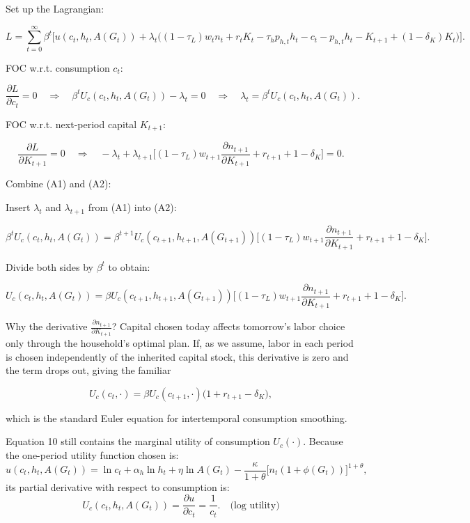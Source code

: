 Set up the Lagrangian:

\[
L = \sum_{t=0}^\infty \beta^t \Big[u(c_t, h_t, A(G_t)) + \lambda_t \Big((1-\tau_L)w_t n_t + r_t K_t - \tau_h p_{h,t} h_t - c_t - p_{h,t} h_t - K_{t+1} + (1-\delta_K)K_t \Big)\Big].
\]

FOC w.r.t. consumption \( c_t \):

\[
\frac{\partial L}{\partial c_t} = 0 \quad \Longrightarrow \quad \beta^t U_c(c_t, h_t, A(G_t)) - \lambda_t = 0 \quad \Longrightarrow \quad \lambda_t = \beta^t U_c(c_t, h_t, A(G_t)). \tag{A1}
\]

FOC w.r.t. next-period capital \( K_{t+1} \):

\[
\frac{\partial L}{\partial K_{t+1}} = 0 \quad \Longrightarrow \quad -\lambda_t + \lambda_{t+1} \Big[(1-\tau_L)w_{t+1} \frac{\partial n_{t+1}}{\partial K_{t+1}} + r_{t+1} + 1 - \delta_K \Big] = 0. \tag{A2}
\]

Combine (A1) and (A2):

Insert \( \lambda_t \) and \( \lambda_{t+1} \) from (A1) into (A2):

\[
\beta^t U_c(c_t, h_t, A(G_t)) = \beta^{t+1} U_c(c_{t+1}, h_{t+1}, A(G_{t+1})) \Big[(1-\tau_L)w_{t+1} \frac{\partial n_{t+1}}{\partial K_{t+1}} + r_{t+1} + 1 - \delta_K \Big].
\]

Divide both sides by \( \beta^t \) to obtain:

\[
U_c(c_t, h_t, A(G_t)) = \beta U_c(c_{t+1}, h_{t+1}, A(G_{t+1})) \Big[(1-\tau_L)w_{t+1} \frac{\partial n_{t+1}}{\partial K_{t+1}} + r_{t+1} + 1 - \delta_K \Big].
\]

Why the derivative \( \frac{\partial n_{t+1}}{\partial K_{t+1}} \)? Capital chosen today affects tomorrow’s labor choice only through the household’s optimal plan. If, as we assume, labor in each period is chosen independently of the inherited capital stock, this derivative is zero and the term drops out, giving the familiar

\[
U_c(c_t, \cdot) = \beta U_c(c_{t+1}, \cdot) \bigl(1 + r_{t+1} - \delta_K\bigr),
\]

which is the standard Euler equation for intertemporal consumption smoothing.

Equation 10 still contains the marginal utility of consumption \(U_c(\cdot)\). Because the one-period utility function chosen is:
\[
u(c_t, h_t, A(G_t)) = \ln c_t + \alpha_h \ln h_t + \eta \ln A(G_t) - \frac{\kappa}{1+\theta}\bigl[n_t(1+\phi(G_t))\bigr]^{1+\theta}, \tag{6}
\]
its partial derivative with respect to consumption is:
\[
U_c(c_t, h_t, A(G_t)) = \frac{\partial u}{\partial c_t} = \frac{1}{c_t}. \quad\text{(log utility)}
\]

